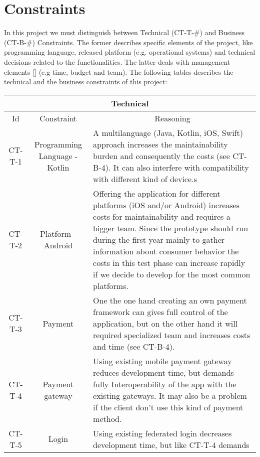 \section{Constraints}

In this project we must distinguish between Technical (CT-T-\#) and Business (CT-B-\#) Constraints. The former describes specific elements
of the project, like programming language, released platform (e.g. operational systems) and technical decisions related to 
the functionalities. The latter deals with management elements [\cite{refonline:EFAD}] (e.g time, budget and team). The following
tables describes the technical and the business constraints of this project: 

\begin{table}[H]
    \begin{tabularx}{\textwidth}{|c|c|X|}
        \hline
        \multicolumn{3}{c}{\textbf{Technical}} \\
        \hline
        \toprule
        \multicolumn{1}{c}{Id} & \multicolumn{1}{c}{Constraint} & \multicolumn{1}{c}{Reasoning} \\
        \midrule
        CT-T-1 & Programming Language - Kotlin & A multilanguage (Java, Kotlin, iOS, Swift) approach increases
        the maintainability burden and consequently the costs (see CT-B-4). It can also interfere with
        compatibility with different kind of device.s  \\ 
        CT-T-2 & Platform - Android & Offering the application for different platforms (iOS and/or Android) increases
        costs for maintainability and requires a bigger team. Since the prototype should run during the
        first year mainly to gather information about consumer behavior the costs in this test phase can
        increase rapidly if we decide to develop for the most common platforms. \\ 
        CT-T-3 & Payment & One the one hand creating an own payment framework can gives full control of the application,
        but on the other hand it will required specialized team and increases costs and time (see CT-B-4). \\
        CT-T-4 & Payment gateway & Using existing \gls{mobile payment gateway} reduces development time, but demands
        fully Interoperability of the app with the existing gateways. It may also be a problem if the \gls{client}
        don't use this kind of payment method. \\
        CT-T-5 & Login & Using existing \gls{federated login} decreases development time, but like CT-T-4 demands

\end{tabularx}
\end{table}
